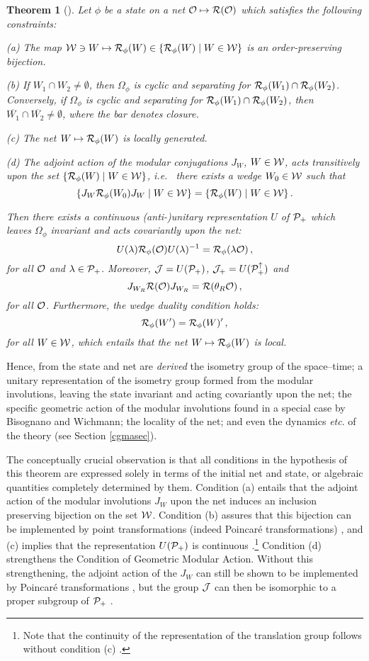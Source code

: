 \documentclass[12pt]{article}
\newtheorem{theorem}{Theorem}[section]
\newcommand{\ie}{{\it i.e.\ }}
\newcommand{\etc}{{\it etc}}
\def\Js{{\cal J}}
\def\Os{{\cal O}}
\def\Ps{{\cal P}}
\def\Rs{{\cal R}}
\def\Ws{{\cal W}}
\def\Pid{{\Ps_+ ^{\uparrow}}}
\begin{document}
\begin{theorem} [\cite{BDFS,BS3}] \label{cgmathm}
Let $\phi$ be a state on a net $\Os \mapsto \Rs(\Os)$ which satisfies the 
following constraints:

   (a) The map 
$\Ws \ni W \mapsto \Rs_\phi(W) \in \{ \Rs_\phi(W) \mid W \in \Ws \}$ is an 
order-preserving bijection.

   (b) If $W_1 \cap W_2 \neq \emptyset$, then $\Omega_\phi$ is
cyclic and separating for $\Rs_\phi(W_1) \cap \Rs_\phi(W_2)$.
Conversely, if $\Omega_\phi$ is cyclic and separating for
$\Rs_\phi(W_1) \cap \Rs_\phi(W_2)$, then 
$\overline{W_1} \cap \overline{W_2} \neq \emptyset$, where the
bar denotes closure.

   (c) The net $W \mapsto \Rs_\phi(W)$ is locally generated.

   (d) The adjoint action of the modular conjugations $J_W$, $W \in \Ws$,
acts transitively upon the set $\{ \Rs_\phi(W) \mid W \in \Ws \}$, \ie
there exists a wedge $W_0 \in \Ws$ such that
%
$$\{ J_W \Rs_\phi(W_0) J_W \mid W \in \Ws \} = 
\{ \Rs_\phi(W) \mid W \in \Ws \} \, . $$

     Then there exists a continuous (anti-)unitary representation
$U$ of $\Ps_+$ which leaves $\Omega_\phi$ invariant and acts covariantly
upon the net:
%
$$U(\lambda) \Rs_\phi(\Os) U(\lambda)^{-1} = \Rs_\phi(\lambda \Os) \, ,$$
%
for all $\Os$ and $\lambda \in \Ps_+$. Moreover, 
$\Js = U(\Ps_+)$, $\Js_+ = U(\Pid)$ and 
%
$$J_{W_R} \Rs(\Os) J_{W_R} = \Rs(\theta_R \Os) \, ,$$
%
for all $\Os$. Furthermore, the wedge duality condition holds:
%
$$\Rs_\phi(W') = \Rs_\phi(W)' \, ,$$
%
for all $W \in \Ws$, which entails that the net $W \mapsto \Rs_\phi(W)$
is local. 
\end{theorem}

     Hence, from the state and net are {\it derived} the isometry group of
the space--time; a unitary representation of the isometry group formed
from the modular involutions, leaving the state invariant and
acting covariantly upon the net; the specific geometric action of the
modular involutions found in a special case by Bisognano and Wichmann;
the locality of the net; and even the dynamics \etc. of the theory
(see Section \ref{cgmasec}).

     The conceptually crucial observation is that all conditions in
the hypothesis of this theorem are expressed solely in terms of the
initial net and state, or algebraic quantities completely determined by
them. Condition (a) entails that the adjoint action of the modular
involutions $J_W$ upon the net induces an inclusion preserving
bijection on the set $\Ws$. Condition (b) assures that this bijection
can be implemented by point transformations (indeed Poincar\'e
transformations) \cite{BDFS}, and (c) implies that the representation
$U(\Ps_+)$ is continuous \cite{BS3}.\footnote{Note that the
continuity of the representation of the translation group follows
without condition (c) \cite{BFS}.}  Condition (d)
strengthens the Condition of Geometric Modular Action. Without this
strengthening, the adjoint action of the $J_W$ can still be shown to be
implemented by Poincar\'e transformations \cite{BDFS}, but the group
$\Js$ can then be isomorphic to a proper subgroup of $\Ps_+$ 
\cite{Flodiss}.
\end{document}
